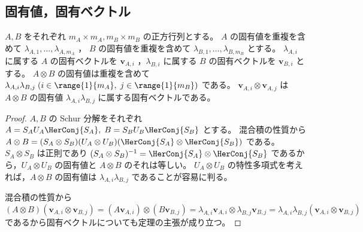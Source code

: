         \subsection{固有値，固有ベクトル}
            \label{Kronecker 積の固有値，固有ベクトル}
            \begin{shadebox}
                $A,B$ をそれぞれ $m_A\times m_A, m_B\times m_B$ の正方行列とする。
                $A$ の固有値を重複を含めて $\lambda_{A,1},\dots,\lambda_{A,m_A}$ ， $B$ の固有値を重複を含めて $\lambda_{B,1},\dots,\lambda_{B,m_B}$ とする。
                $\lambda_{A,i}$ に属する $A$ の固有ベクトルを $\bm{v}_{A,i}$ ，$\lambda_{B,i}$ に属する $B$ の固有ベクトルを $\bm{v}_{B,i}$ とする。
                $A\otimes B$ の固有値は重複を含めて $\lambda_{A,i}\lambda_{B,j}\;(i\in\range{1}{m_A},\;j\in\range{1}{m_B})$ である。
                $\bm{v}_{A,i}\otimes\bm{v}_{A,j}$ は $A\otimes B$ の固有値 $\lambda_{A,i}\lambda_{B,j}$ に属する固有ベクトルである。
            \end{shadebox}
            \begin{proof}
                \quad\par
                $A,B$ の Schur 分解をそれぞれ $A = S_A U_A \HerConj{S_A},\; B = S_B U_B \HerConj{S_B}$ とする。
                混合積の性質から $A\otimes B = (S_A\otimes S_B)(U_A\otimes U_B)(\HerConj{S_A}\otimes\HerConj{S_B})$ である。
                $S_A\otimes S_B$ は正則であり $(S_A\otimes S_B)^{-1} = \HerConj{S_A}\otimes\HerConj{S_B}$ であるから，$U_A\otimes U_B$ の固有値と $A\otimes B$ のそれは等しい。
                $U_A\otimes U_B$ の特性多項式を考えれば，$A\otimes B$ の固有値は $\lambda_{A,i}\lambda_{B,j}$ であることが容易に判る。
                \par
                混合積の性質から $(A\otimes B)(\bm{v}_{A,i}\otimes\bm{v}_{B,j}) = (A\bm{v}_{A,i})\otimes(B\bm{v}_{B,j}) = \lambda_{A,i}\bm{v}_{A,i}\otimes\lambda_{B,j}\bm{v}_{B,j} = \lambda_{A,i}\lambda_{B,j}(\bm{v}_{A,i}\otimes\bm{v}_{B,j})$ であるから固有ベクトルについても定理の主張が成り立つ。
            \end{proof}
